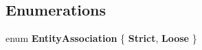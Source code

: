 \subsection*{Enumerations}
\begin{DoxyCompactItemize}
\item 
\hypertarget{namespace_m_b2_d_1_1_entity_component_af25b66eefb854495844f42e40c693767}{}\label{namespace_m_b2_d_1_1_entity_component_af25b66eefb854495844f42e40c693767} 
enum {\bfseries Entity\+Association} \{ {\bfseries Strict}, 
{\bfseries Loose}
 \}
\end{DoxyCompactItemize}
